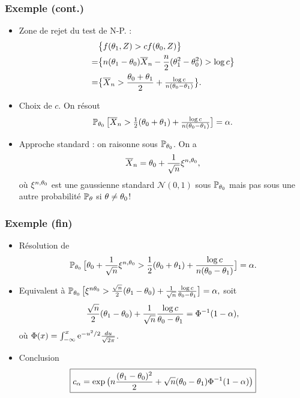 \begin{frame}
\frametitle{Exemple (cont.)}
\begin{itemize}
\item \alert{Zone de rejet} du test de N-P. :
\begin{align*}
& \big\{f(\theta_1,Z) >  cf(\theta_0,Z)\big\}\\
  =& \big\{n(\theta_1-\theta_0)\overline{X}_n-\frac{n}{2}(\theta_1^2-\theta_0^2) > \log c\big\} \\
 =& \big\{\overline{X}_n > \frac{\theta_0+\theta_1}{2}+\tfrac{\log c}{n(\theta_0-\theta_1)}\big\}.
\end{align*}
\item \alert{Choix de $c$}. On résout
$$\operatorname{{\mathbb P}}_{\theta_0}\big[\overline{X}_n > \tfrac{1}{2}(\theta_0+\theta_1)+\tfrac{\log c}{n(\theta_0-\theta_1)}\big]=\alpha.$$
\item \alert{Approche standard} : on raisonne sous $\operatorname{{\mathbb P}}_{\theta_0}$. On a
$$\overline{X}_n = \theta_0 + \frac{1}{\sqrt{n}}\xi^{n,\theta_0},$$
où $\xi^{n,\theta_0}$ est une gaussienne standard ${\mathcal N}(0,1)$ sous $\operatorname{{\mathbb P}}_{\theta_0}$ \alert{mais pas sous une autre probabilité $\operatorname{{\mathbb P}}_\theta$ si $\theta \neq \theta_0$!}
\end{itemize}
\end{frame}

\begin{frame}
\frametitle{Exemple (fin)}
\begin{itemize}
\item \alert{Résolution de}
$$\operatorname{{\mathbb P}}_{\theta_0}\big[\theta_0 + \frac{1}{\sqrt{n}}\xi^{n,\theta_0} > \frac{1}{2}(\theta_0+\theta_1)+\frac{\log c}{n(\theta_0-\theta_1)}\big]=\alpha.$$
\item \alert{Equivalent à}
$\operatorname{{\mathbb P}}_{\theta_0}\big[\xi^{n\theta_0} > \frac{\sqrt{n}}{2}(\theta_1-\theta_0)+\frac{1}{\sqrt{n}}\frac{\log c}{\theta_0-\theta_1}\big]=\alpha,$
soit
$$\frac{\sqrt{n}}{2}(\theta_1-\theta_0)+\frac{1}{\sqrt{n}}\frac{\log c}{\theta_0-\theta_1}=\Phi^{-1}(1-\alpha),$$
où $\Phi(x) = \int_{-\infty}^x \mathrm{e}^{-u^2/2}\tfrac{du}{\sqrt{2\pi}}$.
\item \alert{Conclusion}
$$\boxed{c_\alpha = \exp\big(n\frac{(\theta_1-\theta_0)^2}{2}+\sqrt{n}(\theta_0-\theta_1)\Phi^{-1}(1-\alpha)\big)}$$
\end{itemize}
\end{frame}



